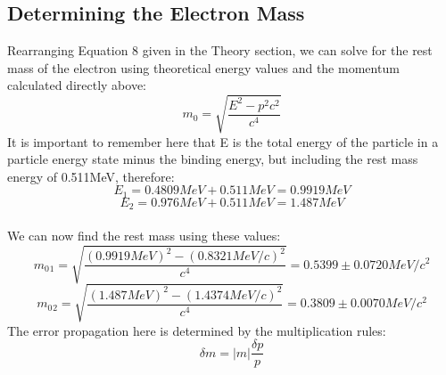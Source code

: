 \subsection{Determining the Electron Mass}
Rearranging Equation 8 given in the Theory section, we can solve for the rest mass of the electron using theoretical energy values and the momentum calculated directly above:
\begin{equation} m_0=\sqrt{\frac{E^2-p^2c^2}{c^4}}\end{equation}
It is important to remember here that E is the total energy of the particle in a particle energy state minus the binding energy, but including the rest mass energy of 0.511MeV, therefore: 
\begin{equation}E_1=0.4809MeV+0.511MeV=0.9919MeV\end{equation} 
\begin{equation}E_2=0.976MeV+0.511MeV=1.487MeV\end{equation}\\
 We can now find the rest mass using these values:
\begin{equation} m_0{_1}=\sqrt{\frac{(0.9919MeV)^2-(0.8321MeV/c)^2}{c^4}}=0.5399\pm0.0720 MeV/c^2\end{equation}
\begin{equation} m_0{_2}=\sqrt{\frac{(1.487MeV)^2-(1.4374MeV/c)^2}{c^4}}=0.3809\pm0.0070 MeV/c^2\end{equation}
The error propagation here is determined by the multiplication rules:
\begin{equation} \delta m= |m|\frac{\delta p}{p} \end {equation}

